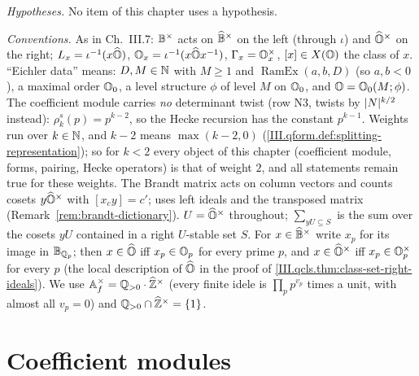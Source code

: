 \noindent\emph{Hypotheses.} No item of this chapter uses a hypothesis.

\noindent\emph{Conventions.} As in Ch.~III.7: $\mathbb{B}^\times$ acts on $\widehat{\mathbb{B}}^\times$ on the left (through $\iota$) and $\widehat{\mathbb{O}}^\times$ on the right;
$L_x=\iota^{-1}(x\widehat{\mathbb{O}})$, $\mathbb{O}_x=\iota^{-1}(x\widehat{\mathbb{O}} x^{-1})$, $\Gamma_x=\mathbb{O}_x^\times$, $[x]\in X(\mathbb{O})$ the class of $x$. ``Eichler data'' means:
$D,M\in\mathbb{N}$ with $M\ge1$ and $\operatorname{RamEx}(a,b,D)$ (so $a,b<0$), a maximal order $\mathbb{O}_0$, a level structure $\phi$ of level $M$ on
$\mathbb{O}_0$, and $\mathbb{O}=\mathbb{O}_0(M;\phi)$. The coefficient module carries \emph{no} determinant twist (row N3, \cite{Shz} twists by
$\lvert N\rvert^{k/2}$ instead): $\rho_k^s(p)=p^{k-2}$, so the Hecke recursion has the constant $p^{k-1}$. Weights run over $k\in\mathbb{N}$, and $k-2$ means
$\max(k-2,0)$ (\cref{III.qform.def:splitting-representation}); so for $k<2$ every object of this chapter (coefficient module, forms, pairing,
Hecke operators) is that of weight $2$, and all statements remain true for these weights. The Brandt matrix acts on column vectors and
counts cosets $y\widehat{\mathbb{O}}^\times$ with $[x_cy]=c'$; \cite{Piz} uses left ideals and the transposed matrix (Remark~\ref{rem:brandt-dictionary}).
$U=\widehat{\mathbb{O}}^\times$ throughout; $\sum_{yU\subseteq S}$ is the sum over the cosets $yU$ contained in a right $U$-stable set $S$. For $x\in\widehat{\mathbb{B}}^\times$
write $x_p$ for its image in $\mathbb{B}_{\mathbb{Q}_p}$; then $x\in\widehat{\mathbb{O}}$ iff $x_p\in\mathbb{O}_p$ for every prime $p$, and $x\in\widehat{\mathbb{O}}^\times$ iff $x_p\in\mathbb{O}_p^\times$
for every $p$ (the local description of $\widehat{\mathbb{O}}$ in the proof of \cref{III.qcls.thm:class-set-right-ideals}). We use
$\mathbb{A}_f^\times=\mathbb{Q}_{>0}\cdot\widehat{\mathbb{Z}}^\times$ (every finite idele is $\prod_pp^{v_p}$ times a unit, with almost all $v_p=0$) and
$\mathbb{Q}_{>0}\cap\widehat{\mathbb{Z}}^\times=\{1\}$.

\section{Coefficient modules}\label{sec:qform-coefficients}

\begin{definition}
\end{definition}

\begin{definition}
\end{definition}

